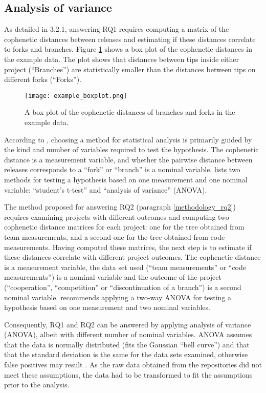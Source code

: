 \subsection{Analysis of variance}
As detailed in 3.2.1, answering RQ1 requires computing a matrix of the cophenetic distances between releases and estimating if these distances correlate to forks and branches. Figure \ref{fig:example_boxplot} shows a box plot of the cophenetic distances in the example data. The plot shows that distances between tips inside either project (“Branches”) are statistically smaller than the distances between tips on different forks (“Forks”).

\begin{figure}[H]
  \centering
  \texttt{[image: example\_boxplot.png]}
  \caption{A box plot of the cophenetic distances of branches and forks in the example data.}
  \label{fig:example_boxplot}
\end{figure}

According to \citet{McDonald2014b}, choosing a method for statistical analysis is primarily guided by the kind and number of variables required to test the hypothesis. The cophenetic distance is a measurement variable, and whether the pairwise distance between releases corresponds to a “fork” or “branch” is a nominal variable. \citet{McDonald2014b} lists two methods for testing a hypothesis based on one measurement and one nominal variable: “student's t-test” and “analysis of variance” (ANOVA).

The method proposed for answering RQ2 (paragraph \ref{methodology_rq2}) requires examining projects with different outcomes and computing two cophenetic distance matrices for each project: one for the tree obtained from team measurements, and a second one for the tree obtained from code measurements. Having computed these matrices, the next step is to estimate if these distances correlate with different project outcomes. The cophenetic distance is a measurement variable, the data set used (“team measurements” or “code measurements”) is a nominal variable and the outcome of the project (“cooperation”, “competition” or “discontinuation of a branch”) is a second nominal variable. \citet{McDonald2014b} recommends applying a two-way ANOVA for testing a hypothesis based on one measurement and two nominal variables.

Consequently, RQ1 and RQ2 can be answered by applying analysis of variance (ANOVA), albeit with different number of nominal variables. ANOVA assumes that the data is normally distributed (fits the Gaussian “bell curve”) and that that the standard deviation is the same for the data sets examined, otherwise false positives may result \citep[p.147]{McDonald2014b}. As the raw data obtained from the repositories did not meet these assumptions, the data had to be transformed to fit the assumptions prior to the analysis.

